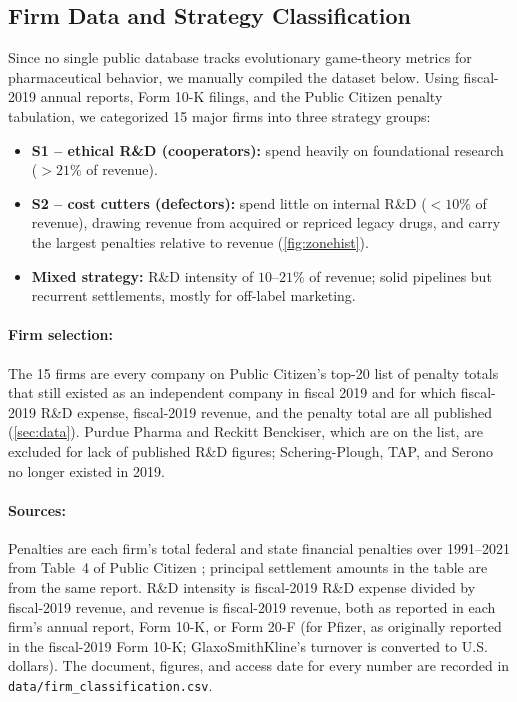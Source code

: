 \documentclass[10pt]{article}
\begin{document}
\begin{appendices}
\section{Firm Data and Strategy Classification}\label{app:firms}
Since no single public database tracks evolutionary game-theory metrics for pharmaceutical behavior, we manually compiled the dataset below. Using fiscal-2019 annual reports, Form 10-K filings, and the Public Citizen penalty tabulation, we categorized 15 major firms into three strategy groups:
\begin{itemize}
    \item \textbf{S1 -- ethical R\&D (cooperators):} spend heavily on foundational research ($>21\%$ of revenue).
    \item \textbf{S2 -- cost cutters (defectors):} spend little on internal R\&D ($<10\%$ of revenue), drawing revenue from acquired or repriced legacy drugs, and carry the largest penalties relative to revenue (\cref{fig:zonehist}).
    \item \textbf{Mixed strategy:} R\&D intensity of $10$--$21\%$ of revenue; solid pipelines but recurrent settlements, mostly for off-label marketing.
\end{itemize}

\paragraph{Firm selection:} The 15 firms are every company on Public Citizen's top-20 list of penalty totals \cite{publiccitizen2024} that still existed as an independent company in fiscal 2019 and for which fiscal-2019 R\&D expense, fiscal-2019 revenue, and the penalty total are all published (\cref{sec:data}). Purdue Pharma and Reckitt Benckiser, which are on the list, are excluded for lack of published R\&D figures; Schering-Plough, TAP, and Serono no longer existed in 2019.

\paragraph{Sources:} Penalties are each firm's total federal and state financial penalties over 1991--2021 from Table~4 of Public Citizen \cite{publiccitizen2024}; principal settlement amounts in the table are from the same report. R\&D intensity is fiscal-2019 R\&D expense divided by fiscal-2019 revenue, and revenue is fiscal-2019 revenue, both as reported in each firm's annual report, Form 10-K, or Form 20-F (for Pfizer, as originally reported in the fiscal-2019 Form 10-K; GlaxoSmithKline's turnover is converted to U.S. dollars). The document, figures, and access date for every number are recorded in \texttt{data/firm\_classification.csv}.


\end{appendices}
\end{document}
